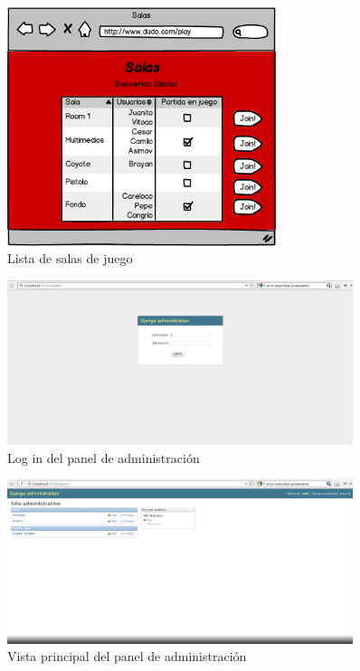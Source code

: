 \documentclass[a4paper,11pt]{article}
\begin{document}
\begin{figure}[h!]
	\centering
	\includegraphics[width=0.7\textwidth]{salas.png}
	\caption{Lista de salas de juego}
\end{figure}
\newpage
\begin{figure}[h!]
	\centering
	\includegraphics[width=0.9\textwidth]{Admin_log.png}
	\caption{Log in del panel de administración}
\end{figure}

\begin{figure}[h!]
	\centering
	\includegraphics[width=0.9\textwidth]{AdminCp.png}
	\caption{Vista principal del panel de administración}
\end{figure}
\end{document}
